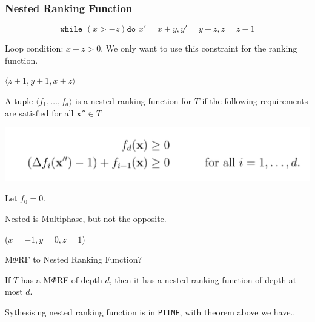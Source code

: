 \documentclass[11pt]{beamer}
\begin{document}
\begin{frame}\frametitle{Nested Ranking Function}
\[\texttt{while }( x > -z) \texttt{do } x' = x + y, y' = y + z, z = z - 1\]

Loop condition: $x + z > 0$. We only want to use this constraint for the ranking function.

$\langle z + 1, y + 1, x + z\rangle$


\begin{definition}

A tuple $\langle f_1, \ldots, f_d\rangle$ is a nested ranking function for $T$ if the following requirements are satisfied for all $\textbf{x}''\in T$
\begin{center}
\includegraphics[scale = 0.3]{6.png}

\end{center}

Let $f_0 = 0$.
\end{definition}

Nested is Multiphase, but not the opposite.

($x = -1, y = 0 , z = 1$)
\end{frame}

\begin{frame}{M$\Phi$RF to Nested Ranking Function?}
\begin{theorem}
If $T$ has a M$\Phi$RF of depth $d$, then it has a nested ranking function of depth at most $d$. 

\end{theorem}

Sythesising nested ranking function is in \texttt{PTIME}, with theorem above we have..
\end{frame}
\end{document}
